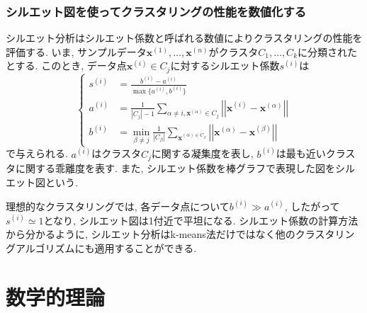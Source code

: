\documentclass[uplatex]{jsarticle}
\theoremstyle{definition}
\numberwithin{equation}{section}
\newcommand{\norm}[1]{\left|\left|#1\right|\right|}
\begin{document}
\subsubsection{シルエット図を使ってクラスタリングの性能を数値化する}
シルエット分析はシルエット係数と呼ばれる数値によりクラスタリングの性能を評価する.
いま, サンプルデータ$\bm{x}^{(1)}, \dots, \bm{x}^{(n)}$がクラスタ$C_{1}, \dots, C_{k}$に分類されたとする.
このとき, データ点$\bm{x}^{(i)} \in C_{j}$に対するシルエット係数$s^{(i)}$は
\begin{equation}
    \left\{
    \begin{aligned}
        s^{(i)} &= \frac{b^{(i)} - a^{(i)}}{\max\{a^{(i)}, b^{(i)}\}} \\
        a^{(i)} &= \frac{1}{|C_{j}| - 1} \sum_{\alpha \neq i, \bm{x}^{(\alpha)} \in C_{j}} \norm{\bm{x}^{(i)} - \bm{x}^{(\alpha)}} \\
        b^{(i)} &= \min_{\beta \neq j} \frac{1}{|C_{\beta}|}\sum_{\bm{x}^{(\alpha) \in C_{\beta}}} \norm{\bm{x}^{(\alpha)} - \bm{x}^{(\beta)}}
    \end{aligned}
    \right.
\end{equation}
で与えられる.
$a^{(i)}$はクラスタ$C_{j}$に関する凝集度を表し, $b^{(i)}$は最も近いクラスタに関する乖離度を表す.
また, シルエット係数を棒グラフで表現した図をシルエット図という.

理想的なクラスタリングでは, 各データ点について$b^{(i)} \gg a^{(i)}$, したがって$s^{(i)} \simeq 1$となり, シルエット図は1付近で平坦になる.
シルエット係数の計算方法から分かるように, シルエット分析はk-means法だけではなく他のクラスタリングアルゴリズムにも適用することができる.


\section{数学的理論}
\end{document}
